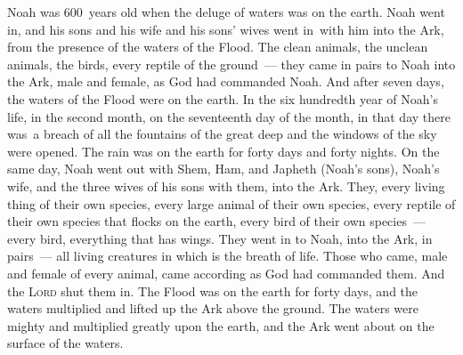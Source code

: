 \begin{inparaenum}
     Noah was 600~years old when the deluge of waters was on the earth.%
     Noah went in, and his sons and his wife and his sons' wives went in\understood\ with him into the Ark, from the presence of the waters of the Flood.%
     The clean animals, the unclean animals, the birds, every reptile of the ground~---%
     they came in pairs to Noah into the Ark, male and female, as God had commanded Noah.%
     And after seven days, the waters of the Flood were on the earth.%
     In the six hundredth year of Noah's life, in the second month, on the seventeenth day of the month, in that day there was\understood\ a breach of all the fountains of the great deep and the windows of the sky were opened.%
     The rain was on the earth for forty days and forty nights.%
     On the same day, Noah went out with Shem, Ham, and Japheth (Noah's sons), Noah's wife, and the three wives of his sons with them, into the Ark.%
     They, every living thing of their own species, every large animal of their own species, every reptile of their own species that flocks on the earth, every bird of their own species~--- every bird, everything that has wings.%
     They went in to Noah, into the Ark, in pairs~--- all living creatures in which is the breath of life.%
     Those who came, male and female of every animal, came according as God had commanded them. And the \textsc{Lord} shut them in.%
     The Flood was on the earth for forty days, and the waters multiplied and lifted up the Ark above the ground.%
     The waters were mighty and multiplied greatly upon the earth, and the Ark went about on the surface of the waters.%
\end{inparaenum}
